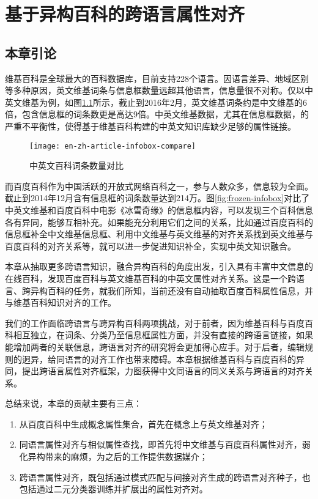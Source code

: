 \chapter{基于异构百科的跨语言属性对齐}
\label{cha:property-matching}

\section{本章引论}
维基百科是全球最大的百科数据库，目前支持228个语言。因语言差异、地域区别等多种原因，英文维基词条与信息框数量远超其他语言，信息量很不对称。仅以中英文维基为例，如图\ref{fig:en-zh-article-infobox-compare}所示，截止到2016年2月，英文维基词条约是中文维基的6倍，包含信息框的词条数更是高达9倍。中英文维基数据，尤其在信息框数据，的严重不平衡性，使得基于维基百科构建的中英文知识库缺少足够的属性链接。

\begin{figure}[h]
  \centering
  \texttt{[image: en-zh-article-infobox-compare]}
  \caption{中英文百科词条数量对比}
  \label{fig:en-zh-article-infobox-compare}
\end{figure}


而百度百科作为中国活跃的开放式网络百科之一，参与人数众多，信息较为全面。截止到2014年12月含有信息框的词条数量达到214万。图\ref{fig:frozen-infobox}对比了中英文维基和百度百科中电影《冰雪奇缘》的信息框内容，可以发现三个百科信息各有异同，能够互相补充。如果能充分利用它们之间的关系，比如通过百度百科的信息框补全中文维基信息框、利用中文维基与英文维基的对齐关系找到英文维基与百度百科的对齐关系等，就可以进一步促进知识补全，实现中英文知识融合。

本章从抽取更多跨语言知识，融合异构百科的角度出发，引入具有丰富中文信息的在线百科，发现百度百科与英文维基百科的中英文属性对齐关系。这是一个跨语言、跨异构百科的任务，就我们所知，当前还没有自动抽取百度百科属性信息，并与维基百科知识对齐的工作。

我们的工作面临跨语言与跨异构百科两项挑战，对于前者，因为维基百科与百度百科相互独立，在词条、分类乃至信息框属性方面，并没有直接的跨语言链接，如果能增加两者的关联信息，跨语言对齐的研究将会更加得心应手。对于后者，编辑规则的迥异，给同语言的对齐工作也带来障碍。本章根据维基百科与百度百科的异同，提出跨语言属性对齐框架，力图获得中文同语言的同义关系与跨语言的对齐关系。

总结来说，本章的贡献主要有三点：
\begin{enumerate}
\item 从百度百科中生成概念属性集合，首先在概念上与英文维基对齐；
\item 同语言属性对齐与相似属性查找，即首先将中文维基与百度百科属性对齐，弱化异构带来的麻烦，为之后的工作提供数据媒介；
\item 跨语言属性对齐，既包括通过模式匹配与间接对齐生成的跨语言对齐种子，也包括通过二元分类器训练并扩展出的属性对齐对。
\end{enumerate}


